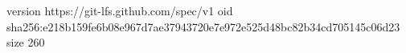 version https://git-lfs.github.com/spec/v1
oid sha256:e218b159fe6b08e967d7ae37943720e7e972e525d48bc82b34cd705145c06d23
size 260
